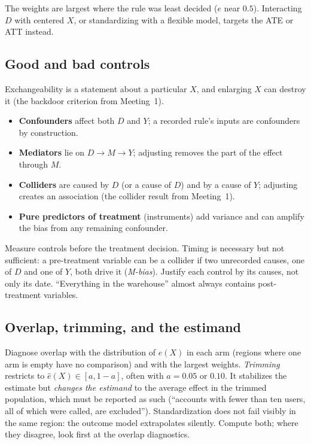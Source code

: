 \documentclass[11pt]{article}
\begin{document}
The weights are largest where the rule was least decided ($e$ near $0.5$). Interacting $D$ with centered $X$, or standardizing
with a flexible model, targets the ATE or ATT instead.

\subsection{Good and bad controls}

Exchangeability is a statement about a particular $X$, and enlarging $X$ can destroy it (the backdoor criterion from Meeting~1).
\begin{itemize}
  \item \textbf{Confounders} affect both $D$ and $Y$; a recorded rule's inputs are confounders by construction.
  \item \textbf{Mediators} lie on $D \to M \to Y$; adjusting removes the part of the effect through $M$.
  \item \textbf{Colliders} are caused by $D$ (or a cause of $D$) and by a cause of $Y$; adjusting creates an association
  (the collider result from Meeting~1).
  \item \textbf{Pure predictors of treatment} (instruments) add variance and can amplify the bias from any remaining
  confounder.
\end{itemize}
Measure controls before the treatment decision. Timing is necessary but not sufficient: a pre-treatment variable can be a
collider if two unrecorded causes, one of $D$ and one of $Y$, both drive it (\emph{M-bias}). Justify each control by its causes,
not only its date. ``Everything in the warehouse'' almost always contains post-treatment variables.

\subsection{Overlap, trimming, and the estimand}

Diagnose overlap with the distribution of $\hat e(X)$ in each arm (regions where one arm is empty have no comparison) and with
the largest weights. \emph{Trimming} restricts to $\hat e(X) \in [a, 1-a]$, often with $a = 0.05$ or $0.10$. It stabilizes the estimate
but \emph{changes the estimand} to the average effect in the trimmed population, which must be reported as such (``accounts with fewer
than ten users, all of which were called, are excluded''). Standardization does not fail visibly in the same region: the outcome
model extrapolates silently. Compute both; where they disagree, look first at the overlap diagnostics.
\end{document}

